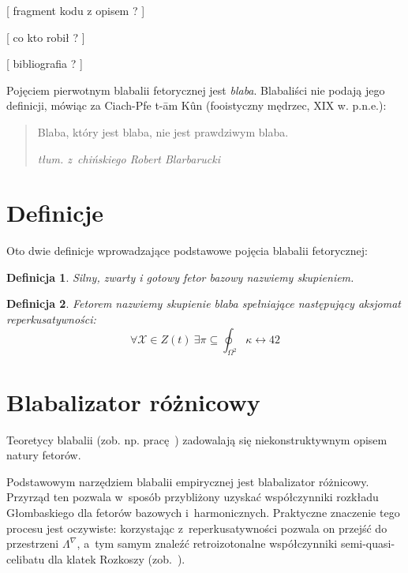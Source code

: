 \documentclass[licencjacka]{pracamgr}
\newtheorem{defi}{Definicja}[section]
\begin{document}
[ fragment kodu z opisem ? ]

[ co kto robił ? ]

[ bibliografia ? ]







Pojęciem pierwotnym blabalii fetorycznej jest \emph{blaba}.
Blabaliści nie podają jego definicji, mówiąc za Ciach-Pfe t-\=am
K\^un (fooistyczny mędrzec, XIX w. p.n.e.):
\begin{quote}
  Blaba, który jest blaba, nie jest prawdziwym blaba.

\raggedleft\slshape tłum. z~chińskiego Robert Blarbarucki
\end{quote}

\section{Definicje}

Oto dwie definicje wprowadzające podstawowe pojęcia blabalii
fetorycznej:

\begin{defi}\label{skupienie}
  Silny, zwarty i gotowy fetor bazowy nazwiemy \emph{skupieniem}.
\end{defi}

\begin{defi}\label{fetor}
  \emph{Fetorem} nazwiemy skupienie blaba spełniające następujący
  \emph{aksjomat reperkusatywności}:
  $$\forall \mathcal{X}\in Z(t)\ \exists
  \pi\subseteq\oint_{\Omega^2}\kappa\leftrightarrow 42$$
\end{defi}


\section{Blabalizator różnicowy}

Teoretycy blabalii (zob. np. pracę~\cite{grglo}) zadowalają się
niekonstruktywnym opisem natury fetorów.

Podstawowym narzędziem blabalii empirycznej jest blabalizator
różnicowy.  Przyrząd ten pozwala w~sposób przybliżony uzyskać
współczynniki rozkładu Głombaskiego dla fetorów bazowych
i~harmonicznych.  Praktyczne znaczenie tego procesu jest oczywiste:
korzystając z~reperkusatywności pozwala on przejść do przestrzeni
$\Lambda^{\nabla}$, a~tym samym znaleźć retroizotonalne współczynniki
semi-quasi-celibatu dla klatek Rozkoszy (zob.~\cite{JR}).
\end{document}
